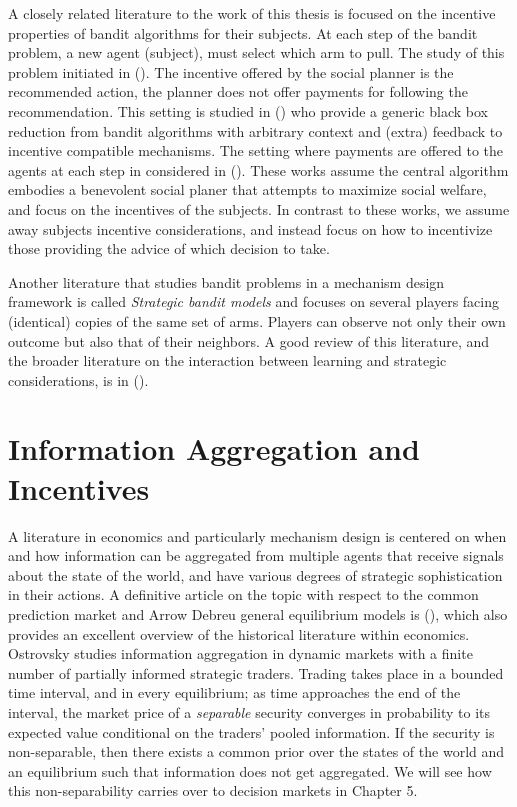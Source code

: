 A closely related literature to the work of this thesis is focused on the incentive properties of bandit algorithms for their subjects.
At each step of the bandit problem, a new agent (subject), must select which arm to pull. 
The study of this problem initiated in (\cite{kremer2014implementing}).
The  incentive offered by the social planner is the recommended action, the planner does not offer payments for following the recommendation. This setting is studied in (\cite{mansour2015bayesian}) who provide a generic black box reduction from bandit algorithms with arbitrary context and (extra) feedback to incentive compatible mechanisms.
The setting where payments are offered to the agents at each step in considered in (\cite{frazier2014incentivizing}).
These works assume the central algorithm embodies a benevolent social planer that attempts to maximize social welfare, and focus on the incentives of the subjects.
In contrast to these works, we assume away subjects incentive considerations, and instead focus on how to incentivize those providing the advice of which decision to take.

Another literature that studies bandit problems in a mechanism design framework is called \emph{Strategic bandit models} and focuses on several players facing (identical) copies of the same set of arms. Players can observe not only their own outcome but also that of their neighbors. A good review of this literature, and the broader literature on the interaction between learning and strategic considerations, is in (\cite{horner2016learning}).

\section{Information Aggregation and Incentives}

A literature in economics and particularly mechanism design is centered on when and how information can be aggregated from multiple agents that receive signals about the state of the world, and have various degrees of strategic sophistication in their actions.
A definitive article on the topic with respect to the common prediction market and Arrow Debreu general equilibrium models is (\cite{ostrovsky2012information}), which also provides an excellent overview of the historical literature within economics.
Ostrovsky studies information aggregation in dynamic markets with a finite number of partially informed strategic traders. 
Trading takes place in a bounded time interval, and in every equilibrium; as time approaches the end of the interval, the market price of a \emph{separable} security converges in probability to its expected value conditional on the traders' pooled information. If the security is non-separable, then there exists a common prior over the states of the world and an equilibrium such that information does not get aggregated. 
We will see how this non-separability carries over to decision markets in Chapter 5.

